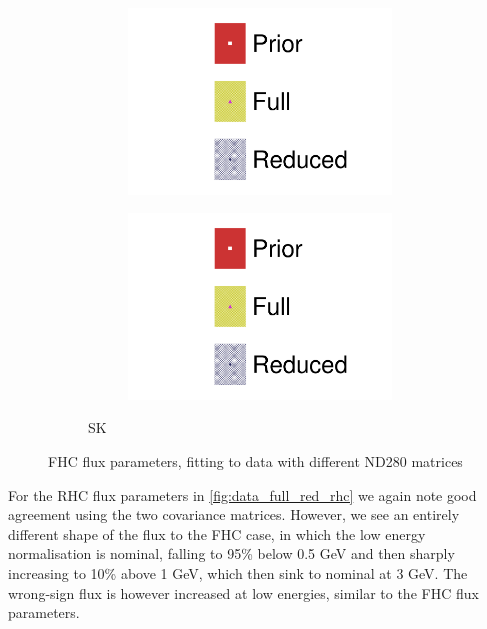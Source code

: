 \begin{figure}[h]
\begin{subfigure}[t]{\textwidth}
\begin{subfigure}[t]{0.24\textwidth}
	\includegraphics[width=\textwidth,page=12, trim={0mm 0mm 0mm 9mm}, clip]{figures/mach3/2018/data/2018a_FixedCov_FullCov_Mpi_Data_merg_2018a_FixedCov_RedCov_Mpi_Data_merge}
\end{subfigure}
\begin{subfigure}[t]{0.24\textwidth}
	\includegraphics[width=\textwidth,page=13, trim={0mm 0mm 0mm 9mm}, clip]{figures/mach3/2018/data/2018a_FixedCov_FullCov_Mpi_Data_merg_2018a_FixedCov_RedCov_Mpi_Data_merge}
\end{subfigure}
\caption{SK}
\end{subfigure}
	\caption{FHC flux parameters, fitting to data with different ND280 matrices}
	\label{fig:data_full_red_fhc}
\end{figure}

For the RHC flux parameters in \autoref{fig:data_full_red_rhc} we again note good agreement using the two covariance matrices. However, we see an entirely different shape of the flux to the FHC case, in which the low energy normalisation is nominal, falling to 95\% below 0.5 GeV and then sharply increasing to 10\% above 1 GeV, which then sink to nominal at 3 GeV. The wrong-sign flux is however increased at low energies, similar to the FHC flux parameters.

